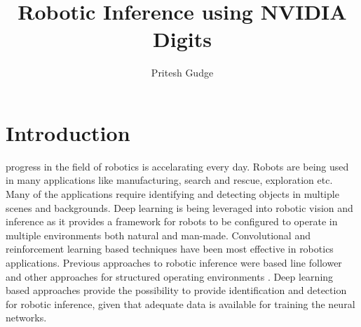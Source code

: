 \documentclass[10pt,journal,compsoc]{IEEEtran}
\begin{document}
\title{Robotic Inference using NVIDIA Digits}

\author{Pritesh Gudge}

%
{}


\maketitle
\IEEEdisplaynontitleabstractindextext
\IEEEpeerreviewmaketitle
\section{Introduction}
\label{sec:introduction}

 progress in the field of robotics is accelarating every day. Robots are being used in many applications like manufacturing, search and rescue, exploration etc. Many of the applications require identifying and detecting objects in multiple scenes and backgrounds. Deep learning is being leveraged into robotic vision and inference as it provides a framework for robots to be configured to operate in multiple environments both natural and man-made. Convolutional and reinforcement learning based techniques have been most effective in robotics applications. Previous approaches to robotic inference were based line follower and other approaches for structured operating environments \cite{linefollower}. Deep learning based approaches provide the possibility to provide identification and detection for robotic inference, given that adequate data is available for training the neural networks. 
\end{document}
